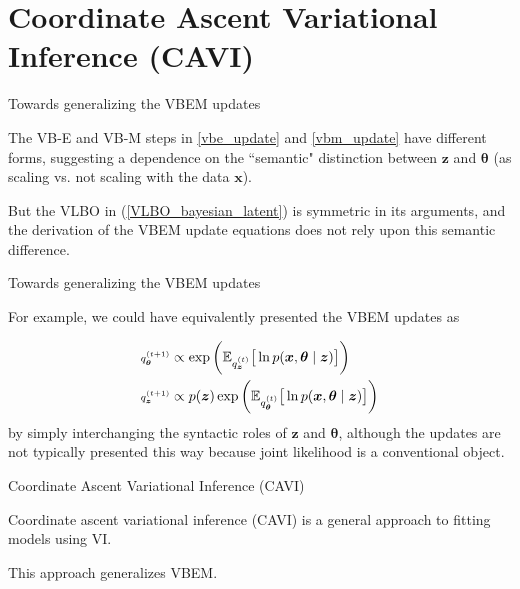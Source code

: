 \documentclass[10pt]{beamer}
\newcommand{\+}[1]{\ensuremath{{\boldsymbol #1}}} %
\newcommand{\cond}{\; | \;}
\newcommand{\E}{\mathbb{E}}
\begin{document}
\section{Coordinate Ascent Variational Inference (CAVI)}

\begin{frame}{Towards generalizing the VBEM updates}



The VB-E and VB-M steps in \eqref{vbe_update} and \eqref{vbm_update} have different forms, suggesting a dependence on the ``semantic" distinction between $\+z$ and $\+\theta$ (as scaling vs. not scaling with the data $\+x$). 

 


But the VLBO in (\ref{VLBO_bayesian_latent}) is symmetric in its arguments, and the derivation of the VBEM update equations does not rely upon this semantic difference. 


\end{frame}

\begin{frame}{Towards generalizing the VBEM updates}


 

For example, we could have equivalently presented the VBEM updates as

 \begin{align}
 \scriptsize
q_{\+\theta}^{(t+1)} &\propto \exp \bigg( \E_{q_\+z^{(t)}} \big[\ln p(\+x, \+\theta \cond \+z) \big] \bigg)  \\
 \scriptsize
q_{\+z}^{(t+1)} &\propto p(\+z) \exp \bigg( \E_{q_\+\theta^{(t)}} \big[\ln p(\+x, \+\theta \cond \+z) \big] \bigg) 
\end{align} 
 by simply interchanging the syntactic roles of $\+z$ and $\+\theta$, although the updates are not typically presented this way because joint likelihood is a conventional object.   

\end{frame}



\begin{frame}{Coordinate Ascent Variational Inference (CAVI)}

Coordinate ascent variational inference (CAVI) is a general approach to fitting models using VI.  

This approach generalizes VBEM.


\end{frame}
\end{document}
